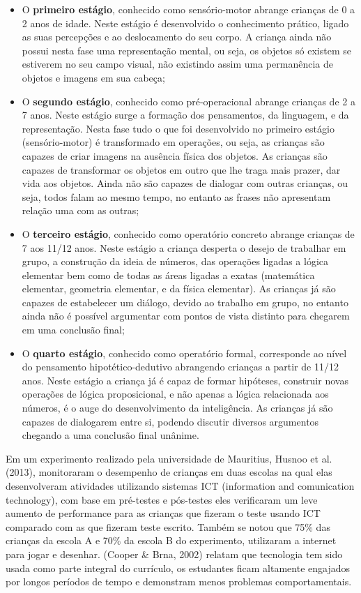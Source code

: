 \begin{itemize}
  \item O \textbf{primeiro estágio}, conhecido como sensório-motor abrange crianças de 0 a 2 anos de idade. Neste estágio é desenvolvido o conhecimento prático, ligado as suas percepções e ao deslocamento do seu corpo. A criança ainda não possui nesta fase uma representação mental, ou seja, os objetos só existem se estiverem no seu campo visual, não existindo assim uma permanência de objetos e imagens em sua cabeça;
  \item O \textbf{segundo estágio}, conhecido como pré-operacional abrange crianças de 2 a 7 anos. Neste estágio surge a formação dos pensamentos, da linguagem, e da representação. Nesta fase tudo o que foi desenvolvido no primeiro estágio (sensório-motor) é transformado em operações, ou seja, as crianças são capazes de criar imagens na ausência física dos objetos. As crianças são capazes de transformar os objetos em outro que lhe traga mais prazer, dar vida aos objetos. Ainda não são capazes de dialogar com outras crianças, ou seja, todos falam ao mesmo tempo, no entanto as frases não apresentam relação uma com as outras;
  \item O \textbf{terceiro estágio}, conhecido como operatório concreto abrange crianças de 7 aos 11/12 anos. Neste estágio a criança desperta o desejo de trabalhar em grupo, a construção da ideia de números, das operações ligadas a lógica elementar bem como de todas as áreas ligadas a exatas (matemática elementar, geometria elementar, e da física elementar). As crianças já são capazes de estabelecer um diálogo, devido ao trabalho em grupo, no entanto ainda não é possível argumentar com pontos de vista distinto para chegarem em uma conclusão final;
  \item O \textbf{quarto estágio}, conhecido como operatório formal, corresponde ao nível do pensamento hipotético-dedutivo abrangendo crianças a partir de 11/12 anos. Neste estágio a criança já é capaz de formar hipóteses, construir novas operações de lógica proposicional, e não apenas a lógica relacionada aos números, é o auge do desenvolvimento da inteligência. As crianças já são capazes de dialogarem entre si, podendo discutir diversos argumentos chegando a uma conclusão final unânime.
\end{itemize}

Em um experimento realizado pela universidade de Mauritius, Husnoo et al. (2013), monitoraram o desempenho de crianças em duas escolas na qual elas desenvolveram atividades utilizando sistemas ICT (information and comunication technology), com base em pré-testes e pós-testes eles verificaram um leve aumento de performance para as crianças que fizeram o teste usando ICT comparado com as que fizeram teste escrito. Também se notou que 75\% das crianças da escola A e 70\% da escola B do experimento, utilizaram a internet para jogar e desenhar. (Cooper \& Brna, 2002) relatam que tecnologia tem sido usada como parte integral do currículo, os estudantes ficam altamente engajados por longos períodos de tempo e demonstram menos problemas comportamentais.

